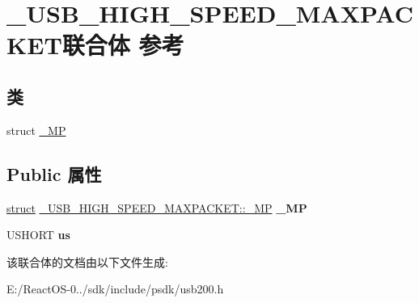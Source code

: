 \hypertarget{union___u_s_b___h_i_g_h___s_p_e_e_d___m_a_x_p_a_c_k_e_t}{}\section{\+\_\+\+U\+S\+B\+\_\+\+H\+I\+G\+H\+\_\+\+S\+P\+E\+E\+D\+\_\+\+M\+A\+X\+P\+A\+C\+K\+E\+T联合体 参考}
\label{union___u_s_b___h_i_g_h___s_p_e_e_d___m_a_x_p_a_c_k_e_t}
\subsection*{类}
\begin{DoxyCompactItemize}
\item 
struct \hyperlink{struct___u_s_b___h_i_g_h___s_p_e_e_d___m_a_x_p_a_c_k_e_t_1_1___m_p}{\+\_\+\+MP}
\end{DoxyCompactItemize}
\subsection*{Public 属性}
\begin{DoxyCompactItemize}
\item 
\mbox{\label{union___u_s_b___h_i_g_h___s_p_e_e_d___m_a_x_p_a_c_k_e_t_a1d79b2dbe74c03eff260ed7b488cf7c5}} 
\hyperlink{interfacestruct}{struct} \hyperlink{struct___u_s_b___h_i_g_h___s_p_e_e_d___m_a_x_p_a_c_k_e_t_1_1___m_p}{\+\_\+\+U\+S\+B\+\_\+\+H\+I\+G\+H\+\_\+\+S\+P\+E\+E\+D\+\_\+\+M\+A\+X\+P\+A\+C\+K\+E\+T\+::\+\_\+\+MP} {\bfseries \+\_\+\+MP}
\item 
\mbox{\label{union___u_s_b___h_i_g_h___s_p_e_e_d___m_a_x_p_a_c_k_e_t_a1a7e810f412b421525e9bdad73365fdc}} 
U\+S\+H\+O\+RT {\bfseries us}
\end{DoxyCompactItemize}


该联合体的文档由以下文件生成\+:\begin{DoxyCompactItemize}
\item 
E\+:/\+React\+O\+S-\/0../sdk/include/psdk/usb200.\+h\end{DoxyCompactItemize}
